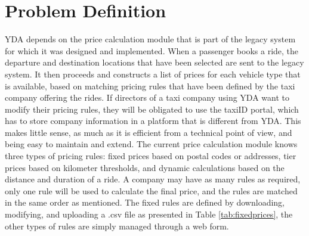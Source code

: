 %
\section{Problem Definition}
YDA depends on the price calculation module that is part of the legacy system for which it was designed and implemented. When a passenger books a ride, the departure and destination locations that have been selected are sent to the legacy system. It then proceeds and constructs a list of prices for each vehicle type that is available, based on matching pricing rules that have been defined by the taxi company offering the rides. If directors of a taxi company using YDA want to modify their pricing rules, they will be obligated to use the taxiID portal, which has to store company information in a platform that is different from YDA. This makes little sense, as much as it is efficient from a technical point of view, and being easy to maintain and extend.
%
%
The current price calculation module knows three types of pricing rules: fixed prices based on postal codes or addresses, tier prices based on kilometer thresholds, and dynamic calculations based on the distance and duration of a ride. A company may have as many rules as required, only one rule will be used to calculate the final price, and the rules are matched in the same order as mentioned. The fixed rules are defined by downloading, modifying, and uploading a .csv file as presented in Table \ref{tab:fixedprices}, the other types of rules are simply managed through a web form.

